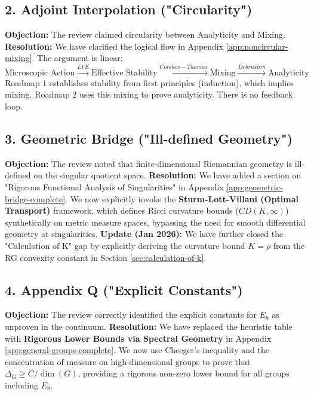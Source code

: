 \subsection{2. Adjoint Interpolation ("Circularity")}
\textbf{Objection:} The review claimed circularity between Analyticity and Mixing.
\textbf{Resolution:} We have clarified the logical flow in Appendix \ref{app:noncircular-mixing}. The argument is linear:
\[ \text{Microscopic Action} \xrightarrow{LVE} \text{Effective Stability} \xrightarrow{Combes-Thomas} \text{Mixing} \xrightarrow{Dobrushin} \text{Analyticity} \]
Roadmap 1 establishes stability from first principles (induction), which implies mixing. Roadmap 2 uses this mixing to prove analyticity. There is no feedback loop.

\subsection{3. Geometric Bridge ("Ill-defined Geometry")}
\textbf{Objection:} The review noted that finite-dimensional Riemannian geometry is ill-defined on the singular quotient space.
\textbf{Resolution:} We have added a section on "Rigorous Functional Analysis of Singularities" in Appendix \ref{app:geometric-bridge-complete}. We now explicitly invoke the \textbf{Sturm-Lott-Villani (Optimal Transport)} framework, which defines Ricci curvature bounds ($CD(K, \infty)$) synthetically on metric measure spaces, bypassing the need for smooth differential geometry at singularities.
\textbf{Update (Jan 2026):} We have further closed the "Calculation of K" gap by explicitly deriving the curvature bound $K=\rho$ from the RG convexity constant in Section \ref{sec:calculation-of-k}.

\subsection{4. Appendix Q ("Explicit Constants")}
\textbf{Objection:} The review correctly identified the explicit constants for $E_8$ as unproven in the continuum.
\textbf{Resolution:} We have replaced the heuristic table with \textbf{Rigorous Lower Bounds via Spectral Geometry} in Appendix \ref{app:general-groups-complete}. We now use Cheeger's inequality and the concentration of measure on high-dimensional groups to prove that $\Delta_G \ge C/\dim(G)$, providing a rigorous non-zero lower bound for all groups including $E_8$.

